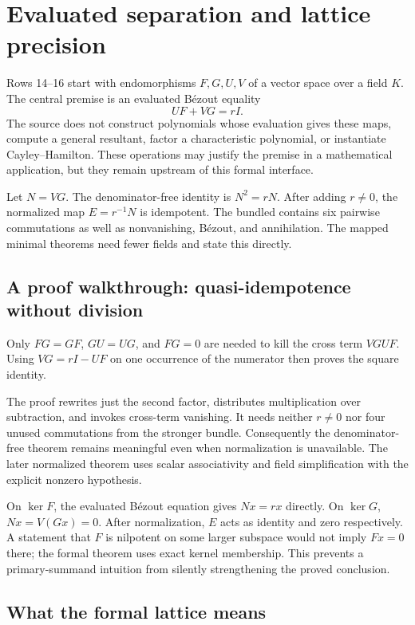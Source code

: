 \section{Evaluated separation and lattice precision}\label{sec:separation}

Rows 14--16 start with endomorphisms $F,G,U,V$ of a vector space over a field $K$. The central premise is an evaluated B\'ezout equality
\[
UF+VG=rI.
\]
The source does not construct polynomials whose evaluation gives these maps, compute a general resultant, factor a characteristic polynomial, or instantiate Cayley--Hamilton. These operations may justify the premise in a mathematical application, but they remain upstream of this formal interface.

Let $N=VG$. The denominator-free identity is $N^2=rN$. After adding $r\ne0$, the normalized map $E=r^{-1}N$ is idempotent. The bundled  contains six pairwise commutations as well as nonvanishing, B\'ezout, and annihilation. The mapped minimal theorems need fewer fields and state this directly.

\subsection{A proof walkthrough: quasi-idempotence without division}

Only $FG=GF$, $GU=UG$, and $FG=0$ are needed to kill the cross term $VGUF$. Using $VG=rI-UF$ on one occurrence of the numerator then proves the square identity.

The proof rewrites just the second factor, distributes multiplication over subtraction, and invokes cross-term vanishing. It needs neither $r\ne0$ nor four unused commutations from the stronger bundle. Consequently the denominator-free theorem remains meaningful even when normalization is unavailable. The later normalized theorem uses scalar associativity and field simplification with the explicit nonzero hypothesis.

On $\ker F$, the evaluated B\'ezout equation gives $Nx=rx$ directly. On $\ker G$, $Nx=V(Gx)=0$. After normalization, $E$ acts as identity and zero respectively. A statement that $F$ is nilpotent on some larger subspace would not imply $Fx=0$ there; the formal theorem uses exact kernel membership. This prevents a primary-summand intuition from silently strengthening the proved conclusion.

\subsection{What the formal lattice means}

